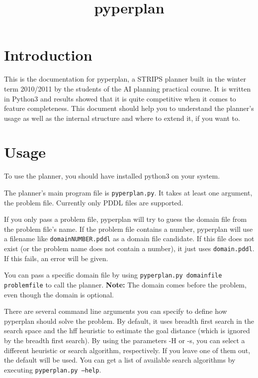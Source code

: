 \documentclass{article}
\title{pyperplan}
\author{}
\begin{document}
\date{}
\maketitle


\tableofcontents

\pagebreak


\hypertarget{toc1}{}
\section{Introduction}

This is the documentation for pyperplan, a STRIPS planner built in the winter
term 2010/2011 by the students of the AI planning practical course. It is
written in Python3 and results showed that it is quite competitive when it comes
to feature completeness. This document should help you to understand the
planner's usage as well as the internal structure and where to extend it, if you
want to.


\hypertarget{toc2}{}
\section{Usage}

To use the planner, you should have installed python3 on your system.

The planner's main program file is \texttt{pyperplan.py}. It takes at least one
argument, the problem file. Currently only PDDL files are supported.

If you only pass a problem file, pyperplan will try to guess the domain
file from the problem file's name. If the problem file contains a number,
pyperplan will use a filename like \texttt{domainNUMBER.pddl} as a domain file
candidate. If this file does not exist (or the problem name does not contain
a number), it just uses \texttt{domain.pddl}. If this fails, an error will be given.

You can pass a specific domain file by using
\texttt{pyperplan.py domainfile problemfile} to call the planner.
\textbf{Note:} The domain comes before the problem, even though the domain is
optional.

There are several command line arguments you can specify to define how pyperplan
should solve the problem. By default, it uses breadth first search in the
search space and the hff heuristic to estimate the goal distance (which is
ignored by the breadth first search). By using the parameters -H or -s, you
can select a different heuristic or search algorithm, respectively. If you
leave one of them out, the default will be used. You can get a list of available
search algorithms by executing \texttt{pyperplan.py --help}.
\end{document}

